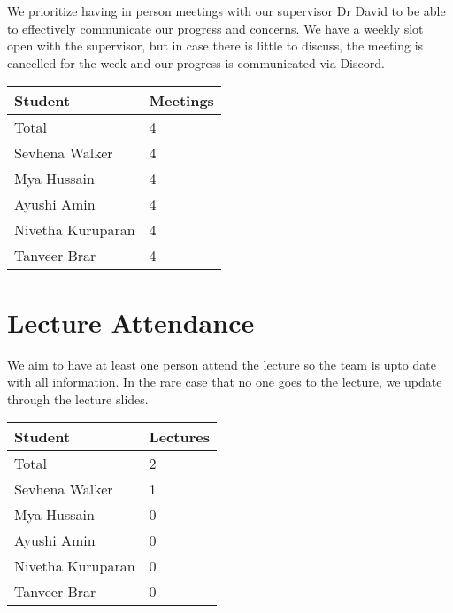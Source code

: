 \documentclass{article}
\begin{document}

We prioritize having in person meetings with our supervisor Dr David
to be able to effectively communicate our progress and concerns. We
have a weekly slot open with the supervisor, but in case there is
little to discuss, the meeting is cancelled for the week and our
progress is communicated via Discord.

\begin{table}[H]
  \centering
  \begin{tabular}{ll}
    \toprule
    \textbf{Student} & \textbf{Meetings}\\
    \midrule
    Total & 4\\
    Sevhena Walker & 4\\
    Mya Hussain & 4\\
    Ayushi Amin & 4\\
    Nivetha Kuruparan & 4\\
    Tanveer Brar & 4\\
    \bottomrule
  \end{tabular}
\end{table}


\section{Lecture Attendance}

We aim to have at least one person attend the lecture so the team is
upto date with all information. In the rare case that no one goes to
the lecture, we update through the lecture slides.


\begin{table}[H]
  \centering
  \begin{tabular}{ll}
    \toprule
    \textbf{Student} & \textbf{Lectures}\\
    \midrule
    Total & 2\\
    Sevhena Walker & 1\\
    Mya Hussain & 0\\
    Ayushi Amin & 0\\
    Nivetha Kuruparan & 0\\
    Tanveer Brar & 0\\
    \bottomrule
  \end{tabular}
\end{table}
\end{document}
